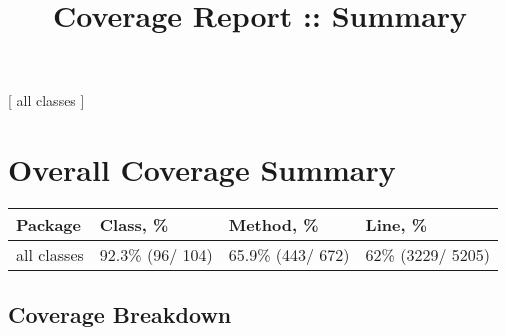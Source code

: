 \documentclass[
]{article}
\title{Coverage Report :: Summary}
\author{}
\date{}
\begin{document}
\maketitle

{[} all classes {]}

\hypertarget{overall-coverage-summary}{%
\section{Overall Coverage Summary}\label{overall-coverage-summary}}

\begin{longtable}[]{@{}llll@{}}
\toprule
Package & Class, \% & Method, \% & Line, \%\tabularnewline
\midrule
\endhead
all classes & { 92.3\% } { (96/ 104) } & { 65.9\% } { (443/ 672) } & {
62\% } { (3229/ 5205) }\tabularnewline
\bottomrule
\end{longtable}

\hfill\break

\hypertarget{coverage-breakdown}{%
\subsection{Coverage Breakdown}\label{coverage-breakdown}}
\end{document}
